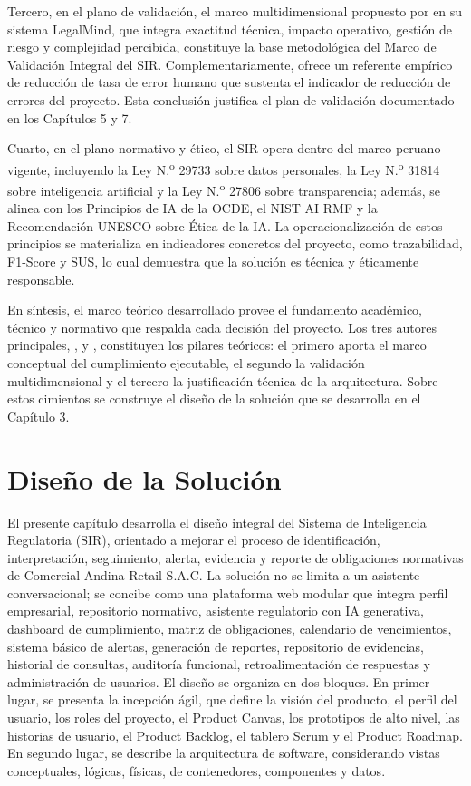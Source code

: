 \documentclass[12pt,a4paper,oneside]{report}
\begin{document}
Tercero, en el plano de validación, el marco multidimensional propuesto por \textcite{raju2025} en su sistema LegalMind, que integra exactitud técnica, impacto operativo, gestión de riesgo y complejidad percibida, constituye la base metodológica del Marco de Validación Integral del SIR. Complementariamente, \textcite{orosz2021} ofrece un referente empírico de reducción de tasa de error humano que sustenta el indicador de reducción de errores del proyecto. Esta conclusión justifica el plan de validación documentado en los Capítulos 5 y 7.

Cuarto, en el plano normativo y ético, el SIR opera dentro del marco peruano vigente, incluyendo la Ley N.\textsuperscript{o} 29733 sobre datos personales, la Ley N.\textsuperscript{o} 31814 sobre inteligencia artificial y la Ley N.\textsuperscript{o} 27806 sobre transparencia; además, se alinea con los Principios de IA de la OCDE, el NIST AI RMF y la Recomendación UNESCO sobre Ética de la IA. La operacionalización de estos principios se materializa en indicadores concretos del proyecto, como trazabilidad, F1-Score y SUS, lo cual demuestra que la solución es técnica y éticamente responsable.

En síntesis, el marco teórico desarrollado provee el fundamento académico, técnico y normativo que respalda cada decisión del proyecto. Los tres autores principales, \textcite{singh2022}, \textcite{raju2025} y \textcite{noronha2025}, constituyen los pilares teóricos: el primero aporta el marco conceptual del cumplimiento ejecutable, el segundo la validación multidimensional y el tercero la justificación técnica de la arquitectura. Sobre estos cimientos se construye el diseño de la solución que se desarrolla en el Capítulo 3.


\chapter{Diseño de la Solución}\label{cap:3-diseno-de-la-solucion}

El presente capítulo desarrolla el diseño integral del Sistema de Inteligencia Regulatoria (SIR), orientado a mejorar el proceso de identificación, interpretación, seguimiento, alerta, evidencia y reporte de obligaciones normativas de Comercial Andina Retail S.A.C. La solución no se limita a un asistente conversacional; se concibe como una plataforma web modular que integra perfil empresarial, repositorio normativo, asistente regulatorio con IA generativa, dashboard de cumplimiento, matriz de obligaciones, calendario de vencimientos, sistema básico de alertas, generación de reportes, repositorio de evidencias, historial de consultas, auditoría funcional, retroalimentación de respuestas y administración de usuarios. El diseño se organiza en dos bloques. En primer lugar, se presenta la incepción ágil, que define la visión del producto, el perfil del usuario, los roles del proyecto, el Product Canvas, los prototipos de alto nivel, las historias de usuario, el Product Backlog, el tablero Scrum y el Product Roadmap. En segundo lugar, se describe la arquitectura de software, considerando vistas conceptuales, lógicas, físicas, de contenedores, componentes y datos.
\end{document}
